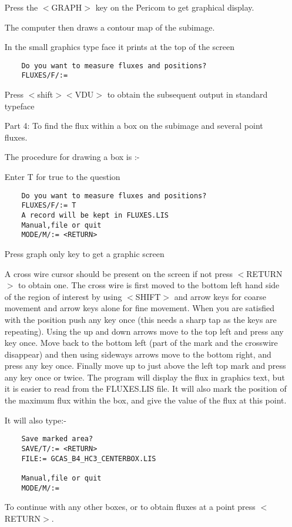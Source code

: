 \begin{itemize}
Press the $<$GRAPH$>$ key on the Pericom to get graphical display.

The computer then draws a contour map of the subimage.

In the small graphics type face it prints at the top of the screen
\begin{verbatim}
    Do you want to measure fluxes and positions?
    FLUXES/F/:=
\end{verbatim}
Press $<$shift$>$$<$VDU$>$ to obtain the subsequent output in standard typeface

\pagebreak
\item [Part 4:] To find the flux within a box on the subimage and several point
fluxes.


The procedure for drawing a box is :-

Enter T for true to the question

\begin{verbatim}
    Do you want to measure fluxes and positions?
    FLUXES/F/:= T
    A record will be kept in FLUXES.LIS
    Manual,file or quit
    MODE/M/:= <RETURN>
\end{verbatim}

Press graph only key to get a graphic screen

A cross wire cursor should be present on the screen if not press $<$RETURN$>$ to
obtain one. The cross wire is first moved to the bottom left hand side of the
region of interest by using $<$SHIFT$>$ and arrow keys for coarse movement and
arrow keys alone for fine movement. When you are satisfied with the position
push any key once (this needs a sharp tap as the keys are repeating). Using the
up and down arrows move to the top left and press any key once. Move back to
the bottom left (part of the mark and the crosswire disappear) and then using
sideways arrows move to the bottom right, and press any key once. Finally move
up to just above the left top mark and press any key once or twice. The program
will display the flux in graphics text, but it is easier to read from the
FLUXES.LIS file. It will also mark the position of the maximum flux within the
box, and give the value of the flux at this point.

It will also type:-
\begin{verbatim}
    Save marked area?
    SAVE/T/:= <RETURN>
    FILE:= GCAS_B4_HC3_CENTERBOX.LIS

    Manual,file or quit
    MODE/M/:=
\end{verbatim}

To continue with any other boxes, or to obtain fluxes at a point press
$<$RETURN$>$.


\end{itemize}
